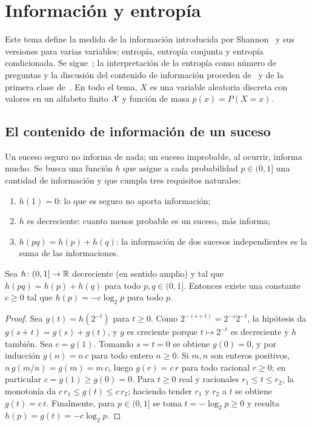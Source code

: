 \chapter{Información y entropía}
\label{tema:1}

Este tema define la medida de la información introducida por Shannon~\cite{shannon} y sus versiones para varias variables: entropía, entropía conjunta y entropía condicionada. Se sigue~\cite[§2.1, §2.2 y §2.5]{ct}; la interpretación de la entropía como número de preguntas y la discusión del contenido de información proceden de~\cite[cap.~2 y~4]{mackay} y de la primera clase de~\cite{camit}. En todo el tema, $X$ es una variable aleatoria discreta con valores en un alfabeto finito $\mathcal{X}$ y función de masa $p(x)=P(X=x)$.

\section{El contenido de información de un suceso}

Un suceso seguro no informa de nada; un suceso improbable, al ocurrir, informa mucho. Se busca una función $h$ que asigne a cada probabilidad $p\in(0,1]$ una cantidad de información y que cumpla tres requisitos naturales:
\begin{enumerate}
  \item $h(1)=0$: lo que es seguro no aporta información;
  \item $h$ es decreciente: cuanto menos probable es un suceso, más informa;
  \item $h(pq)=h(p)+h(q)$: la información de dos sucesos independientes es la suma de las informaciones.
\end{enumerate}

\begin{proposicion}\label{prop:caracterizacion}
Sea $h\colon(0,1]\to\mathbb{R}$ decreciente (en sentido amplio) y tal que $h(pq)=h(p)+h(q)$ para todo $p,q\in(0,1]$. Entonces existe una constante $c\ge 0$ tal que $h(p)=-c\log_2 p$ para todo $p$.
\end{proposicion}

\begin{proof}
Sea $g(t)=h(2^{-t})$ para $t\ge 0$. Como $2^{-(s+t)}=2^{-s}2^{-t}$, la hipótesis da $g(s+t)=g(s)+g(t)$, y $g$ es creciente porque $t\mapsto 2^{-t}$ es decreciente y $h$ también. Sea $c=g(1)$. Tomando $s=t=0$ se obtiene $g(0)=0$, y por inducción $g(n)=n\,c$ para todo entero $n\ge 0$. Si $m,n$ son enteros positivos, $n\,g(m/n)=g(m)=m\,c$, luego $g(r)=c\,r$ para todo racional $r\ge 0$; en particular $c=g(1)\ge g(0)=0$. Para $t\ge 0$ real y racionales $r_1\le t\le r_2$, la monotonía da $c\,r_1\le g(t)\le c\,r_2$; haciendo tender $r_1$ y $r_2$ a $t$ se obtiene $g(t)=c\,t$. Finalmente, para $p\in(0,1]$ se toma $t=-\log_2 p\ge 0$ y resulta $h(p)=g(t)=-c\log_2 p$.
\end{proof}

